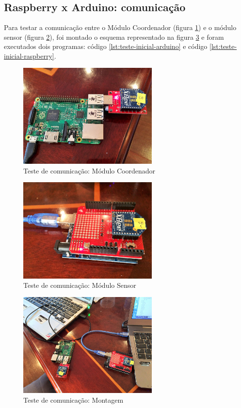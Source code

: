 \subsection{Raspberry x Arduino: comunicação}

Para testar a comunicação entre o Módulo Coordenador (figura \ref{fig:teste-inicial-raspberry}) e o módulo sensor (figura \ref{fig:teste-inicial-arduino}), foi montado o esquema representado na figura \ref{fig:teste-inicial-all} e foram executados dois programas: código \ref{lst:teste-inicial-arduino} e código \ref{lst:teste-inicial-raspberry}.

\begin{figure}[H]
\centering
\includegraphics[width=7cm,keepaspectratio]{figuras/teste-inicial-raspberry.jpg}
\caption{\label{fig:teste-inicial-raspberry} Teste de comunicação: Módulo Coordenador}
\end{figure}

\begin{figure}[H]
\centering
\includegraphics[width=7cm,keepaspectratio]{figuras/teste-inicial-arduino.jpg} 
\caption{\label{fig:teste-inicial-arduino} Teste de comunicação: Módulo Sensor}
\end{figure}

\begin{figure}[H]
\centering
\includegraphics[width=7cm,keepaspectratio]{figuras/teste-inicial-all.jpg} 
\caption{\label{fig:teste-inicial-all} Teste de comunicação: Montagem}
\end{figure}

